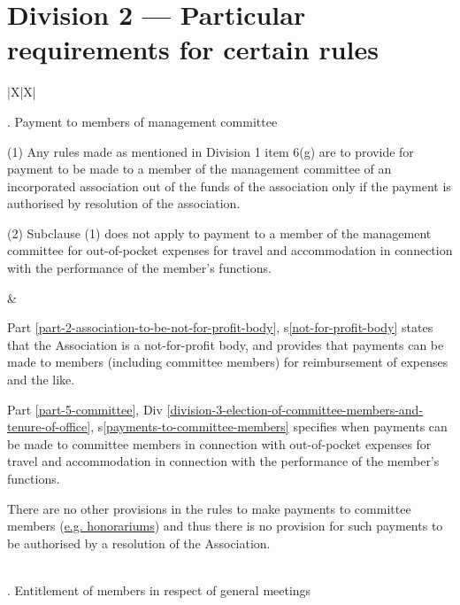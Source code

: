 \documentclass[../constitution.tex]{subfiles}
\begin{document}
\section*{Division 2 — Particular requirements for certain rules }


 {\def\arraystretch{1.3}
  \begin{xltabular}{\textwidth}{ |X|X| }

      . Payment to members of management committee

      \bigskip

      (1) Any rules made as mentioned in Division 1 item 6(g) are to provide
      for payment to be made to a member of the management committee of
      an incorporated association out of the funds of the association only if
      the payment is authorised by resolution of the association.

      \bigskip

      (2) Subclause (1) does not apply to payment to a member of the
      management committee for out-of-pocket expenses for travel and
      accommodation in connection with the performance of the member's
      functions.

      &

      Part \ref{part-2-association-to-be-not-for-profit-body}, s\ref{not-for-profit-body} states that the Association is a not-for-profit body, and provides that payments can be made to members (including committee members) for reimbursement of expenses and the like.

      \bigskip

      Part \ref{part-5-committee}, Div \ref{division-3-election-of-committee-members-and-tenure-of-office}, s\ref{payments-to-committee-members} specifies when payments can be made to committee members in connection with out-of-pocket expenses for travel and accommodation in connection with the performance of the member's functions.

      \bigskip

      There are no other provisions in the rules to make payments to committee members (\href{https://www.commerce.wa.gov.au/books/inc-guide-incorporated-associations-western-australia/paying-committee-members}{e.g. honorariums}) and thus there is no provision for such payments to be authorised by a resolution of the Association.

      \\

      . Entitlement of members in respect of general meetings


\end{xltabular}}
\end{document}
